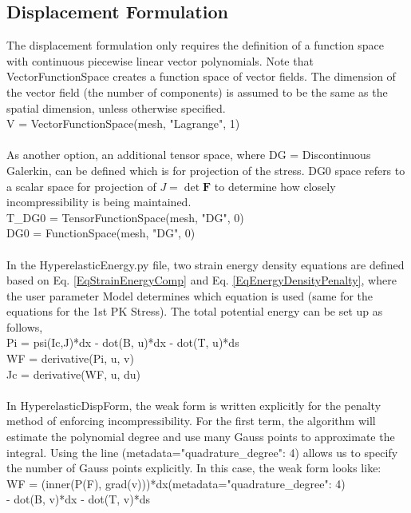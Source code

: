 \documentclass[12pt,3p]{article}
\begin{document}
\subsection{Displacement Formulation}
\vspace{-1ex}
The displacement formulation only requires the definition of a function space with continuous piecewise linear vector polynomials. Note that VectorFunctionSpace creates a function space of vector fields. The dimension of the vector field (the number of components) is assumed to be the same as the spatial dimension, unless otherwise specified. \\
{\selectfont
V = VectorFunctionSpace(mesh, "Lagrange", 1) \\ \\
}
As another option, an additional tensor space, where DG = Discontinuous Galerkin, can be defined which is for projection of the stress. DG0 space refers to a scalar space for projection of $J=\det \mathbf{F}$ to determine how closely incompressibility is being maintained. \\
{\selectfont
T\_DG0 = TensorFunctionSpace(mesh, "DG", 0) \\ 
DG0 = FunctionSpace(mesh, "DG", 0) \\ \\
}
In the {\selectfont HyperelasticEnergy.py} file, two strain energy density equations are defined based on Eq. \ref{EqStrainEnergyComp} and Eq. \ref{EqEnergyDensityPenalty}, where the user parameter {\selectfont Model} determines which equation is used (same for the equations for the 1st PK Stress).  The total potential energy can be set up as follows,\\
{\selectfont 
Pi = psi(Ic,J)*dx - dot(B, u)*dx - dot(T, u)*ds \\
WF = derivative(Pi, u, v) \\
Jc = derivative(WF, u, du)  \\  \\
}
In {\selectfont HyperelasticDispForm}, the weak form is written explicitly for the penalty method of enforcing incompressibility. For the first term, the algorithm will estimate the polynomial degree and use many Gauss points to approximate the integral. Using the line {\selectfont (metadata={"quadrature\_degree": 4})} allows us to specify the number of Gauss points explicitly. In this case, the weak form looks like: \\
 {\selectfont 
WF = (inner(P(F), grad(v)))*dx(metadata={"quadrature\_degree": 4}) \\
\indent \indent - dot(B, v)*dx - dot(T, v)*ds \\ \\
}
\end{document}
